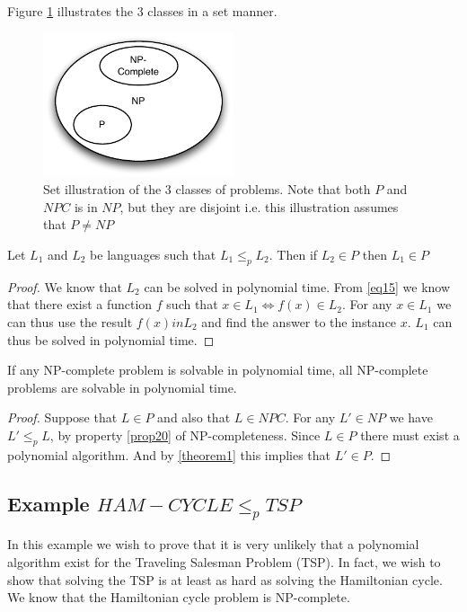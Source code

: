 \documentclass[10pt]{article}
\begin{document}
Figure \ref{fig5} illustrates the 3 classes in a set manner.
\begin{figure}[ht]
\centering
\includegraphics[width=0.5\textwidth]{figures/fig5.pdf}
\caption{Set illustration of the 3 classes of problems. Note that both $P$ and $NPC$ is in $NP$, but they are disjoint i.e. this illustration assumes that $P \neq NP$}
\label{fig5}
\end{figure}

\begin{theorem}
Let $L_1$ and $L_2$ be languages such that $L_1 \leq_p L_2$. Then if $L_2 \in P$ then $L_1 \in P$  
\label{theorem1}
\end{theorem}

\begin{proof}
We know that $L_2$ can be solved in polynomial time. From \ref{eq15} we know that there exist a function $f$ such that $x \in L_1 \Leftrightarrow f(x) \in L_2$. For any $x \in L_1$ we can thus use the result $f(x) in L_2$ and find the answer to the instance $x$. $L_1$ can thus be solved in polynomial time.  
\end{proof}

\begin{theorem}
If any NP-complete problem is solvable in polynomial time, all NP-complete problems are solvable in polynomial time.
\end{theorem}

\begin{proof}
  Suppose that $L \in P$ and also that $L \in NPC$. For any $L' \in NP$ we have $L' \leq_p L$, by property \ref{prop20} of NP-completeness. Since $L \in P$ there must exist a polynomial algorithm. And by \ref{theorem1} this implies that $L' \in P$.
\end{proof}




\subsection{Example $HAM-CYCLE \leq_p TSP$} %
\label{sub:subsection_name}
In this example we wish to prove that it is very unlikely that a polynomial algorithm exist for the Traveling Salesman Problem (TSP). In fact, we wish to show that solving the TSP is at least as hard as solving the Hamiltonian cycle. We know that the Hamiltonian cycle problem is NP-complete. 
\end{document}
